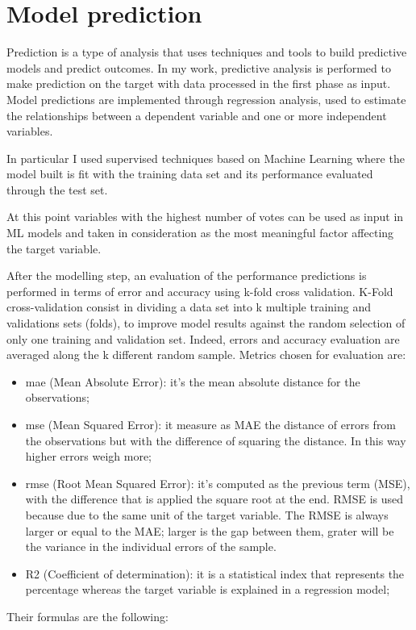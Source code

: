 \section{Model prediction}
Prediction is a type of analysis that uses techniques and tools to build predictive models and predict outcomes. 
In my work, predictive analysis is performed to make prediction on the target with data processed in the first phase as input.\newline
Model predictions are implemented through regression analysis, used to estimate the relationships between a dependent variable and one or more independent variables.\par
In particular I used supervised techniques based on Machine Learning where the model built is fit with the training data set and its performance evaluated through the test set. 
\par
At this point variables with the highest number of votes can be used as input in ML models and taken in consideration as the most meaningful factor affecting the target variable.
\par
After the modelling step, an evaluation of the performance predictions is performed in terms of error and accuracy using k-fold cross validation.\newline
K-Fold cross-validation consist in dividing a data set into k multiple training and validations sets (folds), to improve model results against the random selection of only one training and validation set. Indeed, errors and accuracy evaluation are averaged along the k different random sample.
Metrics chosen for evaluation are:
\begin{itemize}
    \item \acrshort{mae} (Mean Absolute Error): it's the mean absolute distance for the observations;
    \item \acrshort{mse} (Mean Squared Error): it measure as MAE the distance of errors from the observations but with the difference of squaring the distance. In this way higher errors weigh more;
    \item \acrshort{rmse} (Root Mean Squared Error): it's computed as the previous term (MSE), with the difference that is applied the square root at the end. RMSE is used because due to the same unit of the target variable.
    The RMSE is always larger or equal to the MAE; larger is the gap between them, grater will be the variance in the individual errors of the sample.
    \item R2 (Coefficient of determination): it is a statistical index that represents the percentage whereas the target variable is explained in a regression model;
\end{itemize} 
Their formulas are the following:
